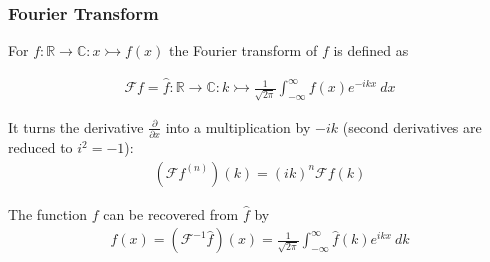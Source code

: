 \subsubsection{Fourier Transform}

For $f : \mathbb{R}\to\mathbb{C} : x \rightarrowtail f(x)$ the Fourier transform of $f$ is defined as

\begin{align*}
    \mathcal{F}f = \hat{f} : \mathbb{R}\to\mathbb{C} : k\rightarrowtail
    \frac{1}{\sqrt{2\pi}}\int_{-\infty}^{\infty}f(x)e^{-ikx}\ dx
\end{align*}

It turns the derivative $\frac{\partial}{\partial x}$ into a multiplication by $-ik$ (second derivatives are reduced to $i^2=-1$):
\begin{align*}
	(\mathcal{F}f^{(n)})(k) = (ik)^n\mathcal{F}f(k)
\end{align*}

The function $f$ can be recovered from $\hat{f}$ by
\begin{align*}
    f(x)=(\mathcal{F}^{-1}\hat{f})(x)
    = \frac{1}{\sqrt{2\pi}}\int_{-\infty}^\infty \hat{f}(k) e^{ikx}\ dk
\end{align*}
